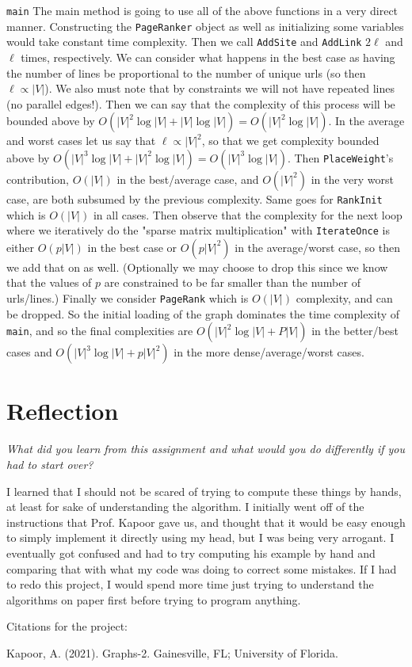 \documentclass[11pt]{article}
\begin{document}
\texttt{main} The main method is going to use all of the above functions in a very direct manner. Constructing the \texttt{PageRanker} object as well as initializing some variables would take constant time complexity. Then we call \texttt{AddSite} and \texttt{AddLink} $2\ell$ and $\ell$ times, respectively. We can consider what happens in the best case as having the number of lines be proportional to the number of unique urls (so then $\ell \propto |V|$). We also must note that by constraints we will not have repeated lines (no parallel edges!). Then we can say that the complexity of this process will be bounded above by $O(|V|^2\log|V| + |V|\log|V|) = O(|V|^2\log|V|)$. In the average and worst cases let us say that $\ell \propto |V|^2$, so that we get complexity bounded above by $O(|V|^3\log|V| + |V|^2\log|V|) = O(|V|^3\log|V|)$. Then \texttt{PlaceWeight}'s contribution, $O(|V|)$ in the best/average case, and $O(|V|^2)$ in the very worst case, are both subsumed by the previous complexity. Same goes for \texttt{RankInit} which is $O(|V|)$ in all cases. Then observe that the complexity for the next loop where we iteratively do the "sparse matrix multiplication" with \texttt{IterateOnce} is either $O(p|V|)$ in the best case or $O(p|V|^2)$ in the average/worst case, so then we add that on as well. (Optionally we may choose to drop this since we know that the values of $p$ are constrained to be far smaller than the number of urls/lines.) Finally we consider \texttt{PageRank} which is $O(|V|)$ complexity, and can be dropped. So the initial loading of the graph dominates the time complexity of \texttt{main}, and so the final complexities are $O(|V|^2\log|V| + P|V|)$ in the better/best cases and $O(|V|^3\log|V| + p|V|^2)$ in the more dense/average/worst cases.

\section{Reflection}
\textit{What did you learn from this assignment and what would you do differently if you had to start over?}

I learned that I should not be scared of trying to compute these things by hands, at least for sake of understanding the algorithm. I initially went off of the instructions that Prof. Kapoor gave us, and thought that it would be easy enough to simply implement it directly using my head, but I was being very arrogant. I eventually got confused and had to try computing his example by hand and comparing that with what my code was doing to correct some mistakes. If I had to redo this project, I would spend more time just trying to understand the algorithms on paper first before trying to program anything.

Citations for the project: 

Kapoor, A. (2021). Graphs-2. Gainesville, FL; University of Florida. 
\end{document}
